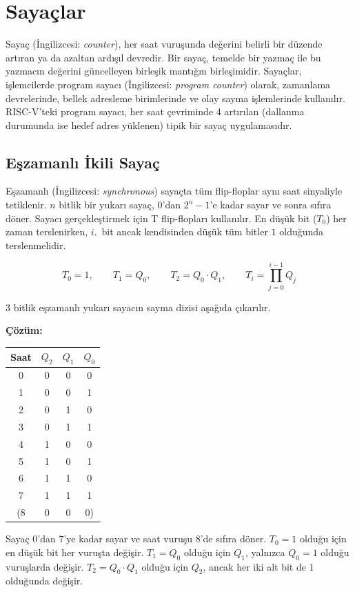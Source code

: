 \section{Sayaçlar}
\label{sec:sayaclar}

Sayaç (İngilizcesi: \textit{counter}), her saat vuruşunda değerini belirli bir düzende artıran ya da azaltan ardışıl devredir. Bir sayaç, temelde bir yazmaç ile bu yazmacın değerini güncelleyen birleşik mantığın birleşimidir. Sayaçlar, işlemcilerde program sayacı (İngilizcesi: \textit{program counter}) olarak, zamanlama devrelerinde, bellek adresleme birimlerinde ve olay sayma işlemlerinde kullanılır. RISC-V'teki program sayacı, her saat çevriminde 4 artırılan (dallanma durumunda ise hedef adres yüklenen) tipik bir sayaç uygulamasıdır.

\subsection{Eşzamanlı İkili Sayaç}

Eşzamanlı (İngilizcesi: \textit{synchronous}) sayaçta tüm flip-floplar aynı saat sinyaliyle tetiklenir. $n$ bitlik bir yukarı sayaç, $0$'dan $2^n - 1$'e kadar sayar ve sonra sıfıra döner. Sayacı gerçekleştirmek için T flip-flopları kullanılır. En düşük bit ($T_0$) her zaman terslenirken, $i$.~bit ancak kendisinden düşük tüm bitler $1$ olduğunda terslenmelidir.

\[
T_0 = 1, \qquad T_1 = Q_0, \qquad T_2 = Q_0 \cdot Q_1, \qquad T_i = \prod_{j=0}^{i-1} Q_j
\]

\begin{ornek}[B.15]
3 bitlik eşzamanlı yukarı sayacın sayma dizisi aşağıda çıkarılır.

\textbf{Çözüm:}

\begin{table}[H]
\centering
\begin{tabular}{c|ccc}
\toprule
\textbf{Saat} & $Q_2$ & $Q_1$ & $Q_0$ \\
\midrule
0 & 0 & 0 & 0 \\
1 & 0 & 0 & 1 \\
2 & 0 & 1 & 0 \\
3 & 0 & 1 & 1 \\
4 & 1 & 0 & 0 \\
5 & 1 & 0 & 1 \\
6 & 1 & 1 & 0 \\
7 & 1 & 1 & 1 \\
(8 & 0 & 0 & 0) \\
\bottomrule
\end{tabular}
\end{table}

Sayaç $0$'dan $7$'ye kadar sayar ve saat vuruşu 8'de sıfıra döner. $T_0 = 1$ olduğu için en düşük bit her vuruşta değişir. $T_1 = Q_0$ olduğu için $Q_1$, yalnızca $Q_0 = 1$ olduğu vuruşlarda değişir. $T_2 = Q_0 \cdot Q_1$ olduğu için $Q_2$, ancak her iki alt bit de $1$ olduğunda değişir.
\end{ornek}

